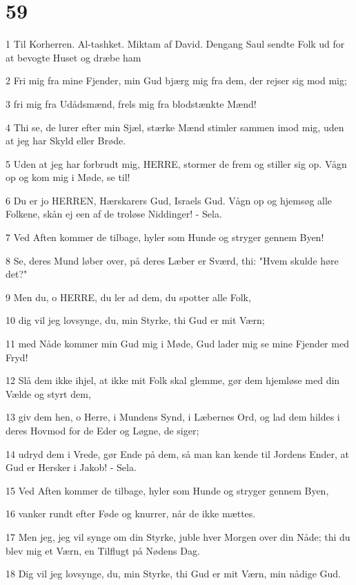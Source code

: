 \chapter{59}

\par 1 Til Korherren. Al-tashket. Miktam af David. Dengang Saul sendte Folk ud for at bevogte Huset og dræbe ham
\par 2 Fri mig fra mine Fjender, min Gud bjærg mig fra dem, der rejser sig mod mig;
\par 3 fri mig fra Udådsmænd, frels mig fra blodstænkte Mænd!
\par 4 Thi se, de lurer efter min Sjæl, stærke Mænd stimler sammen imod mig, uden at jeg har Skyld eller Brøde.
\par 5 Uden at jeg har forbrudt mig, HERRE, stormer de frem og stiller sig op. Vågn op og kom mig i Møde, se til!
\par 6 Du er jo HERREN, Hærskarers Gud, Israels Gud. Vågn op og hjemsøg alle Folkene, skån ej een af de troløse Niddinger! - Sela.
\par 7 Ved Aften kommer de tilbage, hyler som Hunde og stryger gennem Byen!
\par 8 Se, deres Mund løber over, på deres Læber er Sværd, thi: "Hvem skulde høre det?"
\par 9 Men du, o HERRE, du ler ad dem, du spotter alle Folk,
\par 10 dig vil jeg lovsynge, du, min Styrke, thi Gud er mit Værn;
\par 11 med Nåde kommer min Gud mig i Møde, Gud lader mig se mine Fjender med Fryd!
\par 12 Slå dem ikke ihjel, at ikke mit Folk skal glemme, gør dem hjemløse med din Vælde og styrt dem,
\par 13 giv dem hen, o Herre, i Mundens Synd, i Læbernes Ord, og lad dem hildes i deres Hovmod for de Eder og Løgne, de siger;
\par 14 udryd dem i Vrede, gør Ende på dem, så man kan kende til Jordens Ender, at Gud er Hersker i Jakob! - Sela.
\par 15 Ved Aften kommer de tilbage, hyler som Hunde og stryger gennem Byen,
\par 16 vanker rundt efter Føde og knurrer, når de ikke mættes.
\par 17 Men jeg, jeg vil synge om din Styrke, juble hver Morgen over din Nåde; thi du blev mig et Værn, en Tilflugt på Nødens Dag.
\par 18 Dig vil jeg lovsynge, du, min Styrke, thi Gud er mit Værn, min nådige Gud.

